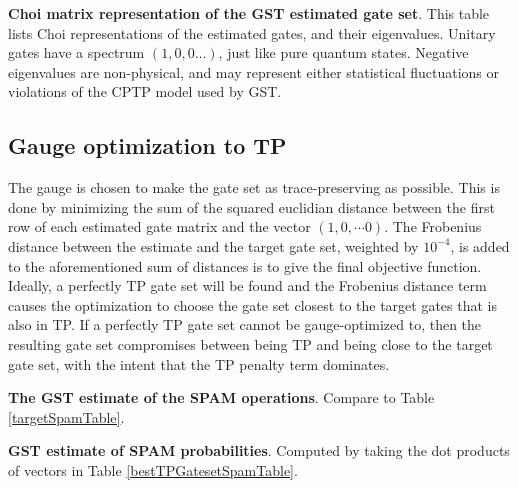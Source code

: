 {\begin{table}[h]
\begin{center}
\caption{\textbf{Choi matrix representation of the GST estimated gate set}.  This table lists Choi representations of the estimated gates, and their eigenvalues.  Unitary gates have a spectrum $(1,0,0\ldots)$, just like pure quantum states.  Negative eigenvalues are non-physical, and may represent either statistical fluctuations or violations of the CPTP model used by GST.\label{bestTargetGatesGatesetChoiTable}}
\end{center}
\end{table}

\clearpage

\subsection{Gauge optimization to TP}
The gauge is chosen to make the gate set as trace-preserving as possible.  This is done by minimizing the sum of the squared euclidian distance between the first row of each estimated gate matrix and the vector $(1,0,\cdots 0)$.  The Frobenius distance between the estimate and the target gate set, weighted by $10^{-4}$, is added to the aforementioned sum of distances is to give the final objective function.  Ideally, a perfectly TP gate set will be found and the Frobenius distance term causes the optimization to choose the gate set closest to the target gates that is also in TP.  If a perfectly TP gate set cannot be gauge-optimized to, then the resulting gate set compromises between being TP and being close to the target gate set, with the intent that the TP penalty term dominates.

\begin{table}[h]
\begin{center}
\caption{\textbf{The GST estimate of the SPAM operations}.  Compare to Table \ref{targetSpamTable}.\label{bestTPGatesetSpamTable}}
\end{center}
\end{table}

\begin{table}[h]
\begin{center}
\caption{\textbf{GST estimate of SPAM probabilities}.  Computed by taking the dot products of vectors in Table \ref{bestTPGatesetSpamTable}.\label{bestTPGatesetSpamParametersTable}}
\end{center}
\end{table}

}
